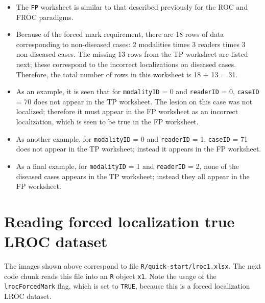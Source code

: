\documentclass[
]{book}
\providecommand{\tightlist}{%
  \setlength{\itemsep}{0pt}\setlength{\parskip}{0pt}}
\begin{document}
\begin{itemize}
\tightlist
\item
  The \texttt{FP} worksheet is similar to that described previously for the ROC and FROC paradigms.
\item
  Because of the forced mark requirement, there are 18 rows of data corresponding to non-diseased cases: 2 modalities times 3 readers times 3 non-diseased cases. The missing 13 rows from the TP worksheet are listed next; these correspond to the incorrect localizations on diseased cases. Therefore, the total number of rows in this worksheet is 18 + 13 = 31.
\item
  As an example, it is seen that for \texttt{modalityID} = 0 and \texttt{readerID} = 0, \texttt{caseID} = 70 does not appear in the TP worksheet. The lesion on this case was not localized; therefore it must appear in the FP worksheet as an incorrect localization, which is seen to be true in the FP worksheet.
\item
  As another example, for \texttt{modalityID} = 0 and \texttt{readerID} = 1, \texttt{caseID} = 71 does not appear in the TP worksheet; instead it appears in the FP worksheet.
\item
  As a final example, for \texttt{modalityID} = 1 and \texttt{readerID} = 2, none of the diseased cases appears in the TP worksheet; instead they all appear in the FP worksheet.
\end{itemize}

\hypertarget{quick-start-lroc-data-1}{%
\section{Reading forced localization true LROC dataset}\label{quick-start-lroc-data-1}}

The images shown above correspond to file \texttt{R/quick-start/lroc1.xlsx}. The next code chunk reads this file into an \texttt{R} object \texttt{x1}. Note the usage of the \texttt{lrocForcedMark} flag, which is set to \texttt{TRUE}, because this is a forced localization LROC dataset.
\end{document}
